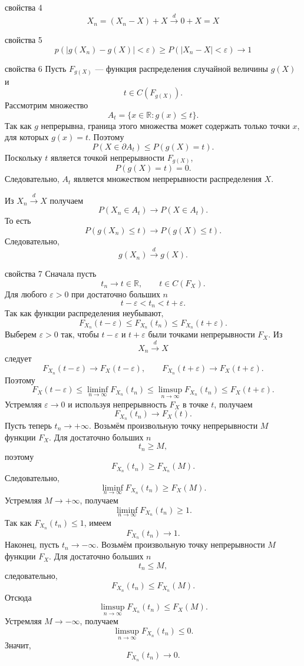 \documentclass[12pt,a4paper]{article}
\begin{document}
\begin{proofbox}{свойства 4}
\[
X_n = (X_n - X) + X \xrightarrow{d} 0 + X = X
\]
\end{proofbox}

\begin{proofbox}{свойства 5}
\[
p(|g(X_n) - g(X)| < \varepsilon) \geq P(|X_n - X| < \varepsilon) \longrightarrow 1
\]
\end{proofbox}

\begin{proofbox}{свойства 6}
Пусть $F_{g(X)}$ --- функция распределения случайной величины $g(X)$ и
\[
t\in C(F_{g(X)}).
\]
Рассмотрим множество
\[
A_t=\{x\in\mathbb{R}:g(x)\leq t\}.
\]
Так как $g$ непрерывна, граница этого множества может содержать только точки $x$, для которых $g(x)=t$. Поэтому
\[
P(X\in\partial A_t)
\leq
P(g(X)=t).
\]
Поскольку $t$ является точкой непрерывности $F_{g(X)}$,
\[
P(g(X)=t)=0.
\]
Следовательно, $A_t$ является множеством непрерывности распределения $X$.

Из $X_n\xrightarrow{d}X$ получаем
\[
P(X_n\in A_t)
\longrightarrow
P(X\in A_t).
\]
То есть
\[
P(g(X_n)\leq t)
\longrightarrow
P(g(X)\leq t).
\]
Следовательно,
\[
g(X_n)\xrightarrow{d}g(X).
\]
\end{proofbox}

\begin{proofbox}{свойства 7}
Сначала пусть
\[
t_n\longrightarrow t\in\mathbb{R},
\qquad
t\in C(F_X).
\]
Для любого $\varepsilon>0$ при достаточно больших $n$
\[
t-\varepsilon<t_n<t+\varepsilon.
\]
Так как функции распределения неубывают,
\[
F_{X_n}(t-\varepsilon)
\leq
F_{X_n}(t_n)
\leq
F_{X_n}(t+\varepsilon).
\]
Выберем $\varepsilon>0$ так, чтобы $t-\varepsilon$ и $t+\varepsilon$ были точками непрерывности $F_X$. Из
\[
X_n\xrightarrow{d}X
\]
следует
\[
F_{X_n}(t-\varepsilon)\longrightarrow F_X(t-\varepsilon),
\qquad
F_{X_n}(t+\varepsilon)\longrightarrow F_X(t+\varepsilon).
\]
Поэтому
\[
F_X(t-\varepsilon)
\leq
\liminf_{n\to\infty}F_{X_n}(t_n)
\leq
\limsup_{n\to\infty}F_{X_n}(t_n)
\leq
F_X(t+\varepsilon).
\]
Устремляя $\varepsilon\to0$ и используя непрерывность $F_X$ в точке $t$, получаем
\[
F_{X_n}(t_n)\longrightarrow F_X(t).
\]
Пусть теперь $t_n\to+\infty$. Возьмём произвольную точку непрерывности $M$ функции $F_X$. Для достаточно больших $n$
\[
t_n\geq M,
\]
поэтому
\[
F_{X_n}(t_n)\geq F_{X_n}(M).
\]
Следовательно,
\[
\liminf_{n\to\infty}F_{X_n}(t_n)
\geq F_X(M).
\]
Устремляя $M\to+\infty$, получаем
\[
\liminf_{n\to\infty}F_{X_n}(t_n)\geq1.
\]
Так как $F_{X_n}(t_n)\leq1$, имеем
\[
F_{X_n}(t_n)\longrightarrow1.
\]
Наконец, пусть $t_n\to-\infty$. Возьмём произвольную точку непрерывности $M$ функции $F_X$. Для достаточно больших $n$
\[
t_n\leq M,
\]
следовательно,
\[
F_{X_n}(t_n)\leq F_{X_n}(M).
\]
Отсюда
\[
\limsup_{n\to\infty}F_{X_n}(t_n)
\leq F_X(M).
\]
Устремляя $M\to-\infty$, получаем
\[
\limsup_{n\to\infty}F_{X_n}(t_n)\leq0.
\]
Значит,
\[
F_{X_n}(t_n)\longrightarrow0.
\]
\end{proofbox}
\end{document}
